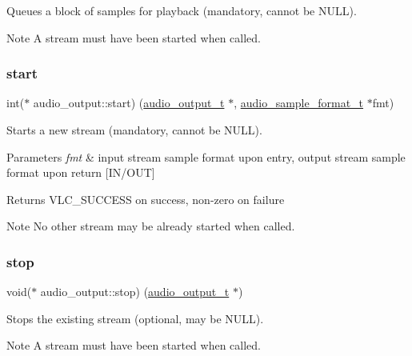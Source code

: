 Queues a block of samples for playback (mandatory, cannot be N\+U\+LL). \begin{DoxyNote}{Note}
A stream must have been started when called. 
\end{DoxyNote}
\mbox{\label{structaudio__output_a41bc9e8671e11adb721781af2a277cc7}} 
\subsubsection{\texorpdfstring{start}{start}}
{\footnotesize\ttfamily int($\ast$ audio\+\_\+output\+::start) (\hyperlink{structaudio__output}{audio\+\_\+output\+\_\+t} $\ast$, \hyperlink{structaudio__format__t}{audio\+\_\+sample\+\_\+format\+\_\+t} $\ast$fmt)}

Starts a new stream (mandatory, cannot be N\+U\+LL). 
\begin{DoxyParams}{Parameters}
{\em fmt} & input stream sample format upon entry, output stream sample format upon return \mbox{[}I\+N/\+O\+UT\mbox{]} \\
\hline
\end{DoxyParams}
\begin{DoxyReturn}{Returns}
V\+L\+C\+\_\+\+S\+U\+C\+C\+E\+SS on success, non-\/zero on failure 
\end{DoxyReturn}
\begin{DoxyNote}{Note}
No other stream may be already started when called. 
\end{DoxyNote}
\mbox{\label{structaudio__output_ad045b1c68f0e60ed577046bd77e3591b}} 
\subsubsection{\texorpdfstring{stop}{stop}}
{\footnotesize\ttfamily void($\ast$ audio\+\_\+output\+::stop) (\hyperlink{structaudio__output}{audio\+\_\+output\+\_\+t} $\ast$)}

Stops the existing stream (optional, may be N\+U\+LL). \begin{DoxyNote}{Note}
A stream must have been started when called. 
\end{DoxyNote}
\mbox{\label{structaudio__output_a88143cf6018fefbba4a9a0e8284067b9}} 
